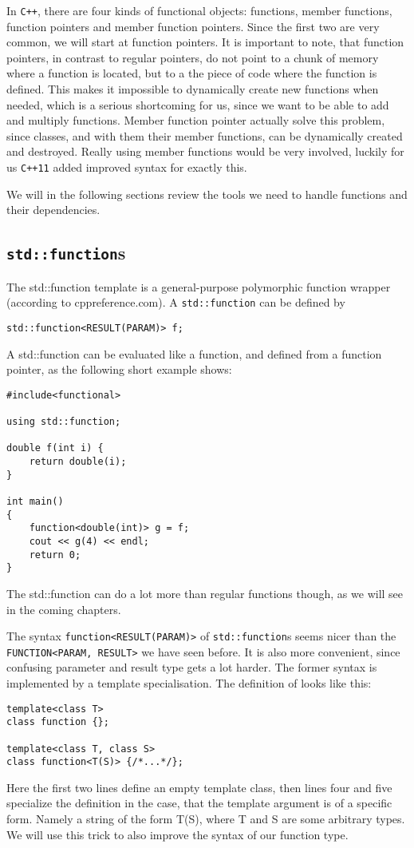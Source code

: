 \documentclass{article}
\newcommand{\cc}{\texttt{C++}\xspace}
\newcommand{\ccOx}{\texttt{C++11}\xspace}
\begin{document}
In \cc, there are four kinds of functional objects: functions, member functions, function pointers and member function pointers. Since the first two are very common, we will start at function pointers. It is important to note, that function pointers, in contrast to regular pointers, do not point to a chunk of memory where a function is located, but to a the piece of code where the function is defined. This makes it impossible to dynamically create new functions when needed, which is a serious shortcoming for us, since we want to be able to add and multiply functions. Member function pointer actually solve this problem, since classes, and with them their member functions, can be dynamically created and destroyed. Really using member functions would be very involved, luckily for us \ccOx added improved syntax for exactly this.

We will in the following sections review the tools we need to handle functions and their dependencies.

\subsection{\texttt{std::function}s}

The std::function template is a general-purpose polymorphic function wrapper (according to cppreference.com). A \texttt{std::function} can be defined by
\begin{lstlisting}
std::function<RESULT(PARAM)> f;
\end{lstlisting}

A std::function can be evaluated like a function, and defined from a function pointer, as the following short example shows:
\begin{lstlisting}
#include<functional>

using std::function;

double f(int i) {
	return double(i);
}

int main()
{
	function<double(int)> g = f;
	cout << g(4) << endl;
	return 0;
}
\end{lstlisting}
The std::function can do a lot more than regular functions though, as we will see in the coming chapters.

The syntax \texttt{function<RESULT(PARAM)>} of \texttt{std::function}s seems nicer than the \texttt{FUNCTION<PARAM, RESULT>} we have seen before. It is also more convenient, since confusing parameter and result type gets a lot harder. The former syntax is implemented by a template specialisation. The definition of looks like this:
\begin{lstlisting}
template<class T>
class function {};

template<class T, class S>
class function<T(S)> {/*...*/};
\end{lstlisting}
Here the first two lines define an empty template class, then lines four and five specialize the definition in the case, that the template argument is of a specific form. Namely a string of the form T(S), where T and S are some arbitrary types. We will use this trick to also improve the syntax of our function type.
\end{document}
